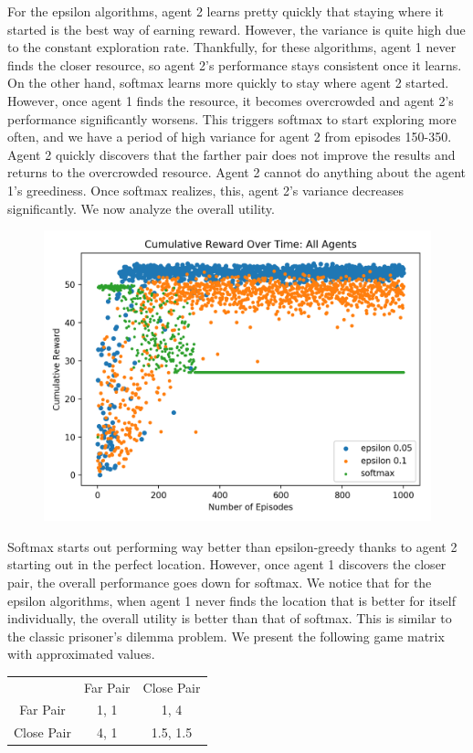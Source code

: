 \documentclass[11pt]{article}
\begin{document}
For the epsilon algorithms, agent 2 learns pretty quickly that staying where it started is the best way of earning reward. However, the variance is quite high due to the constant exploration rate. Thankfully, for these algorithms, agent 1 never finds the closer resource, so agent 2's performance stays consistent once it learns. On the other hand, softmax learns more quickly to stay where agent 2 started. However, once agent 1 finds the resource, it becomes overcrowded and agent 2's performance significantly worsens. This triggers softmax to start exploring more often, and we have a period of high variance for agent 2 from episodes 150-350. Agent 2 quickly discovers that the farther pair does not improve the results and returns to the overcrowded resource. Agent 2 cannot do anything about the agent 1's greediness. Once softmax realizes, this, agent 2's variance decreases significantly. We now analyze the overall utility.


\begin{figure}[h]
  \centering
  \includegraphics[width=.7\textwidth]{ai-env2}
\end{figure}


Softmax starts out performing way better than epsilon-greedy thanks to agent 2 starting out in the perfect location. However, once agent 1 discovers the closer pair, the overall performance goes down for softmax. We notice that for the epsilon algorithms, when agent 1 never finds the location that is better for itself individually, the overall utility is better than that of softmax. This is similar to the classic prisoner's dilemma problem. We present the following game matrix with approximated values.

\begin{center}
\begin{tabular}{ c c c }
  & Far Pair & Close Pair \\ 
 Far Pair & 1, 1 & 1, 4 \\  
 Close Pair & 4, 1 & 1.5, 1.5    
\end{tabular}
\end{center}
\end{document}
